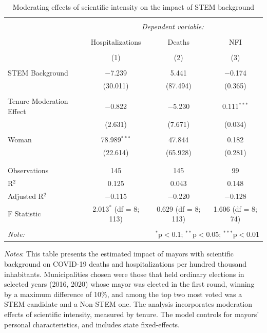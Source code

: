 \documentclass[
  letterpaper,
  DIV=11,
  numbers=noendperiod]{scrartcl}
\begin{document}
\begin{table}[!htbp] \centering 
  \caption{Moderating effects of scientific intensity on the impact of STEM background} 
  \label{} 
\begin{tabular}{@{\extracolsep{5pt}}lccc} 
\\[-1.8ex]\hline 
\hline \\[-1.8ex] 
 & \multicolumn{3}{c}{\textit{Dependent variable:}} \\ 
\cline{2-4} 
\\[-1.8ex] & Hospitalizations & Deaths & NFI \\ 
\\[-1.8ex] & (1) & (2) & (3)\\ 
\hline \\[-1.8ex] 
 STEM Background & $-$7.239 & 5.441 & $-$0.174 \\ 
  & (30.011) & (87.494) & (0.365) \\ 
  & & & \\ 
 Tenure Moderation Effect & $-$0.822 & $-$5.230 & 0.111$^{***}$ \\ 
  & (2.631) & (7.671) & (0.034) \\ 
  & & & \\ 
 Woman & 78.989$^{***}$ & 47.844 & 0.182 \\ 
  & (22.614) & (65.928) & (0.281) \\ 
  & & & \\ 
\hline \\[-1.8ex] 
Observations & 145 & 145 & 99 \\ 
R$^{2}$ & 0.125 & 0.043 & 0.148 \\ 
Adjusted R$^{2}$ & $-$0.115 & $-$0.220 & $-$0.128 \\ 
F Statistic & 2.013$^{*}$ (df = 8; 113) & 0.629 (df = 8; 113) & 1.606 (df = 8; 74) \\ 
\hline 
\hline \\[-1.8ex] 
\textit{Note:}  & \multicolumn{3}{r}{$^{*}$p$<$0.1; $^{**}$p$<$0.05; $^{***}$p$<$0.01} \\ 
\end{tabular} 
\end{table}

\emph{Notes}: This table presents the estimated impact of mayors with
scientific background on COVID-19 deaths and hospitalizations per
hundred thousand inhabitants. Municipalities chosen were those that held
ordinary elections in selected years (2016, 2020) whose mayor was
elected in the first round, winning by a maximum difference of 10\%, and
among the top two most voted was a STEM candidate and a Non-STEM one.
The analysis incorporates moderation effects of scientific intensity,
measured by tenure. The model controls for mayors' personal
characteristics, and includes state fixed-effects.
\end{document}
